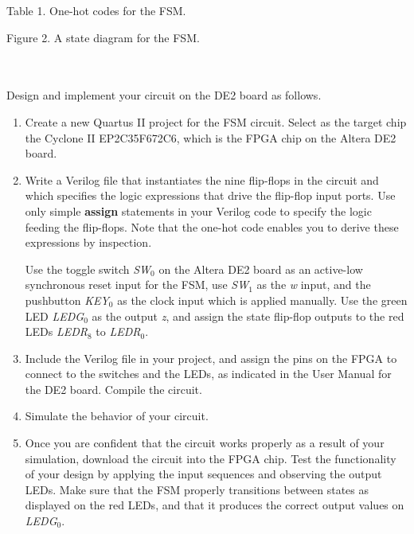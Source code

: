 \documentclass[epsfig,10pt,fullpage]{article}
\begin{document}
\begin{center}
Table 1. One-hot codes for the FSM.
\end{center}

\begin{figure}[H]
\scriptsize
\centerline{
\hbox{}}
\end{figure}
\centerline{Figure 2.  A state diagram for the FSM.}
~\\
~\\
Design and implement your circuit on the DE2 board as follows.

\begin{enumerate}
\item Create a new Quartus II project for the FSM circuit. Select as the target chip the 
Cyclone II EP2C35F672C6, which is the FPGA chip on the Altera DE2 board.

\item Write a Verilog file that instantiates the nine flip-flops in the circuit and which
specifies the logic expressions that drive the flip-flop input ports. Use only
simple {\bf assign} statements in your Verilog code to specify the logic feeding the
flip-flops. Note that the one-hot code enables you to derive these expressions by
inspection.

Use the toggle switch {\it SW}$_0$ on the Altera DE2 board as an active-low synchronous reset input
for the FSM, use {\it SW}$_1$ as the {\it w} input, and the pushbutton {\it KEY}$_0$ as the clock input which 
is applied manually.  Use the green LED {\it LEDG}$_0$ as the output {\it z}, 
and assign the state flip-flop outputs to the red LEDs {\it LEDR}$_8$ to {\it LEDR}$_0$.

\item Include the Verilog file in your project, and assign the pins on the FPGA to 
connect to the switches and the LEDs, as indicated in the User Manual for the DE2 board.
Compile the circuit.

\item Simulate the behavior of your circuit.

\item Once you are confident that the circuit works properly as a result of your
simulation, download the circuit into the FPGA chip.  Test the functionality of your 
design by applying the input sequences and observing the output LEDs. Make sure that the
FSM properly transitions between states as displayed on the red LEDs, and that it produces
the correct output values on {\it LEDG}$_0$.


\end{enumerate}
\end{document}
